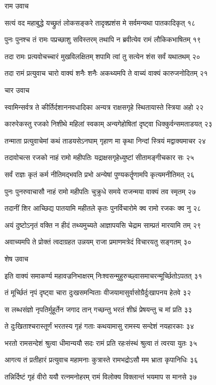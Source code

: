 राम उवाच

सत्यं वद महाबुद्धे यच्छ्रुतं लोकसङ्करे
तादृक्प्रशंस मे सर्वमन्यथा पातकादिकृत् १८

पुनः पुनश्च तं रामः पप्रच्छाशु सविस्तरम्
तथापि न ब्रवीत्येव रामं लौकिकभाषितम् १९

तदा रामः प्रत्यवोचच्चारं मुखविलक्षितम्
शपामि त्वां तु सत्येन शंस सर्वं यथातथम् २०

तदा रामं प्रत्युवाच चारो वाक्यं शनैः शनैः
अकथ्यमपि ते वाच्यं वाक्यं कारुजनोदितम् २१

चार उवाच

स्वामिन्सर्वत्र ते कीर्तिर्दशाननवधादिका
अन्यत्र राक्षसगृहे स्थितायास्ते स्त्रिया अहो २२

कारुरेकस्तु रजको निशीथे महिलां स्वकाम्
अन्यगेहोषितां दृष्ट्वा धिक्कुर्वन्समताडयत् २३

तन्माता प्रत्युवाचेमां कथं ताडयसेऽनघाम्
गृहाण मा कृथा निन्दां स्त्रियं मद्वाक्यमाचर २४

तदावोचत्स रजको नाहं रामो महीपतिः
यद्राक्षसगृहेध्युष्टां सीतामङ्गीचकार सः २५

सर्वं राज्ञः कृतं कर्म नीतिमद्भवति प्रभो
अन्येषां पुण्यकर्तॄणामपि कृत्यमनीतिमत् २६

पुनः पुनरुवाचासौ नाहं रामो महीपतिः
चुक्रुधे समये राजन्मया वाक्यं तव स्मृतम् २७

तदानीं शिर आच्छिद्य पातयामि महीतले
कृतः पुनर्विचारोमे क्व रामो रजकः क्व नु २८

अयं दुष्टोऽनृतं वक्ति न हीदं तथ्यमुच्यते
आज्ञापयसि चेद्राम साम्प्रतं मारयामि तम् २९

अवाच्यमपि ते प्रोक्तं त्वदाग्रहत उन्नयम्
राजा प्रमाणमत्रेदं विचारयतु सङ्गतम् ३०

शेष उवाच

इति वाक्यं समाकर्ण्य महावज्रनिभाक्षरम्
निःश्वसन्मुहुरुच्छ्वासमाचरन्मूर्च्छितोऽपतत् ३१

तं मूर्च्छितं नृपं दृष्ट्वा चारा दुःखसमन्विताः
वीजयामासुर्वासोग्रैर्दुःखापनय हेतवे ३२

स लब्धसंज्ञो नृपतिर्मुहूर्तेन जगाद तान्
गच्छन्तु भरतं शीघ्रं प्रेषयन्तु च मां प्रति ३३

ते दुःखिताश्चरास्तूर्णं भरतस्य गृहं गताः
कथयामासु रामस्य सन्देशं नयहारकाः ३४

भरतो रामसन्देशं श्रुत्वा धीमान्ययौ सदः
रामं प्रति रहःसंस्थं श्रुत्वा तं त्वरया युतः ३५

आगत्य तं प्रतीहारं प्रत्युवाच महामनाः
कुत्रास्ते रामभद्रोऽसौ मम भ्राता कृपानिधिः ३६

तन्निर्दिष्टं गृहं वीरो ययौ रत्नमनोहरम्
रामं विलोक्य विक्लान्तं भयमाप स मानसे ३७

